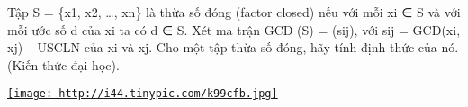 Tập S = \{x1, x2, …, xn\} là thừa số đóng (factor closed) nếu với mỗi xi ∈ S  và với mỗi ước số d của  xi ta có d ∈ S. Xét ma trận GCD  (S) = (sij), với sij = GCD(xi, xj) – USCLN của xi và xj.  Cho một tập thừa số đóng, hãy tính định thức của nó. (Kiến thức đại học).  

\href{http://tinypic.com}{
\texttt{[image: http://i44.tinypic.com/k99cfb.jpg]}}

\